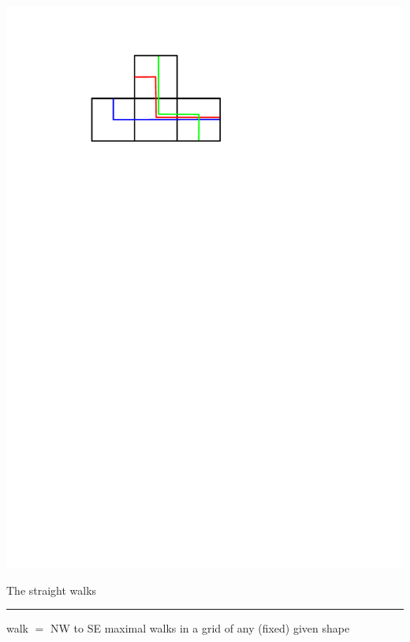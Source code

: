 \documentclass[portrait,final,a0paper,fontscale=0.25]{baposter}
\theoremstyle{definition}
\begin{document}
\begin{poster}
{\hspace*{.3cm}\includegraphics[scale=.3]{NotAKiss}

{\footnotesize The straight walks}
\hspace*{.8cm}{\footnotesize A kiss}
\hspace*{1.3cm}{\footnotesize A shy kiss}
\hspace*{1.1cm}{\footnotesize No kissing}



\vspace{-.2cm}
\hspace{-.25cm}
{\color{green} \rule{10.02cm}{1pt}}
\vspace{-.35cm}

{\color{green} walk} $=$ NW to SE maximal walks in a grid of any (fixed) given shape %

}
\end{poster}
\end{document}
